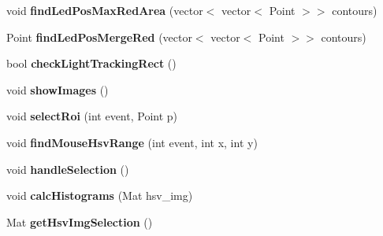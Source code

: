 \begin{DoxyCompactItemize}
\item 
\hypertarget{classLedDetector_ae7a234c682707e08d7f2c4bd4e6c0612}{}void {\bfseries find\+Led\+Pos\+Max\+Red\+Area} (vector$<$ vector$<$ Point $>$$>$ contours)\label{classLedDetector_ae7a234c682707e08d7f2c4bd4e6c0612}

\item 
\hypertarget{classLedDetector_a7c471d039e52c020165aa88a72757620}{}Point {\bfseries find\+Led\+Pos\+Merge\+Red} (vector$<$ vector$<$ Point $>$$>$ contours)\label{classLedDetector_a7c471d039e52c020165aa88a72757620}

\item 
\hypertarget{classLedDetector_a9fedc896713ce18b75e35648c8d7e5ea}{}bool {\bfseries check\+Light\+Tracking\+Rect} ()\label{classLedDetector_a9fedc896713ce18b75e35648c8d7e5ea}

\item 
\hypertarget{classLedDetector_abd427704b5fb3ff3ef526d1cfcf993f5}{}void {\bfseries show\+Images} ()\label{classLedDetector_abd427704b5fb3ff3ef526d1cfcf993f5}

\item 
\hypertarget{classLedDetector_a165f9967f6f339932485ae828228b6ea}{}void {\bfseries select\+Roi} (int event, Point p)\label{classLedDetector_a165f9967f6f339932485ae828228b6ea}

\item 
\hypertarget{classLedDetector_a0e7ff5c747230fd89aad172c7f1b7dd6}{}void {\bfseries find\+Mouse\+Hsv\+Range} (int event, int x, int y)\label{classLedDetector_a0e7ff5c747230fd89aad172c7f1b7dd6}

\item 
\hypertarget{classLedDetector_aa57d8649c167e85241ef80769b7f5dd8}{}void {\bfseries handle\+Selection} ()\label{classLedDetector_aa57d8649c167e85241ef80769b7f5dd8}

\item 
\hypertarget{classLedDetector_aa272c18d3e03dc0d8f423657d0cd1cbb}{}void {\bfseries calc\+Histograms} (Mat hsv\+\_\+img)\label{classLedDetector_aa272c18d3e03dc0d8f423657d0cd1cbb}

\item 
\hypertarget{classLedDetector_a0b853d6f2d525ba10b0c39e9376dc56a}{}Mat {\bfseries get\+Hsv\+Img\+Selection} ()\label{classLedDetector_a0b853d6f2d525ba10b0c39e9376dc56a}

\end{DoxyCompactItemize}
